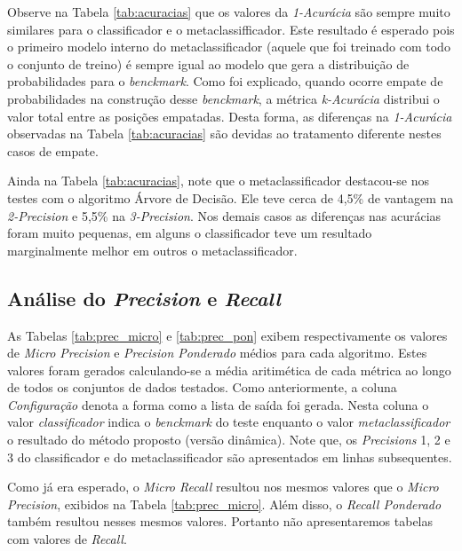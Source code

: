 Observe na Tabela \ref{tab:acuracias} que os valores da \textit{1-Acurácia} são sempre muito similares para o classificador e o metaclassifficador.
Este resultado é esperado pois o primeiro modelo interno do metaclassificador (aquele que foi treinado com todo o conjunto de treino) é sempre igual ao modelo que gera a distribuição de probabilidades para o \textit{benckmark}.
Como foi explicado, quando ocorre empate de probabilidades na construção desse \textit{benckmark}, a métrica \textit{k-Acurácia} distribui o valor total entre as posições empatadas.
Desta forma, as diferenças na \textit{1-Acurácia} observadas na Tabela \ref{tab:acuracias} são devidas ao tratamento diferente nestes casos de empate.

Ainda na Tabela \ref{tab:acuracias}, note que o metaclassificador destacou-se nos testes com o algoritmo Árvore de Decisão.
Ele teve cerca de 4,5\% de vantagem na \textit{2-Precision} e 5,5\% na \textit{3-Precision}.
Nos demais casos as diferenças nas acurácias foram muito pequenas, em alguns o classificador teve um resultado marginalmente melhor em outros o metaclassificador.

\subsection{Análise do \textit{Precision} e \textit{Recall}}

As Tabelas \ref{tab:prec_micro} e \ref{tab:prec_pon} exibem respectivamente os valores de \textit{Micro Precision} e \textit{Precision Ponderado} médios para cada algoritmo.
Estes valores foram gerados calculando-se a média aritimética de cada métrica ao longo de todos os conjuntos de dados testados.
Como anteriormente, a coluna \textit{Configuração} denota a forma como a lista de saída foi gerada. 
Nesta coluna o valor \textit{classificador} indica o \textit{benckmark} do teste enquanto o valor \textit{metaclassificador} o resultado do método proposto (versão dinâmica).
Note que, os \textit{Precisions} 1, 2 e 3 do classificador e do metaclassificador são apresentados em linhas subsequentes.

Como já era esperado, o \textit{Micro Recall} resultou nos mesmos valores que o \textit{Micro Precision}, exibidos na Tabela \ref{tab:prec_micro}.
Além disso, o \textit{Recall Ponderado} também resultou nesses mesmos valores.
Portanto não apresentaremos tabelas com valores de \textit{Recall}.

